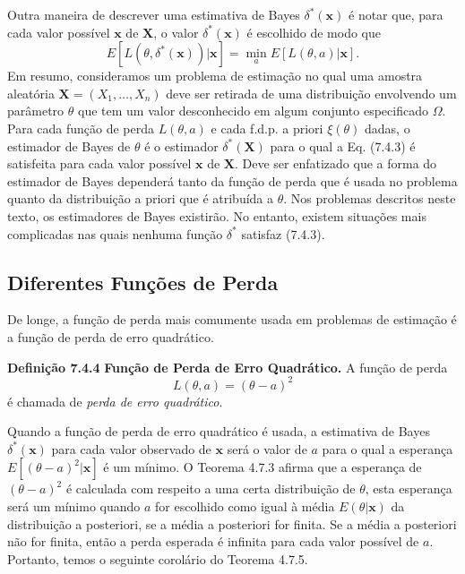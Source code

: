\vspace{1cm}
Outra maneira de descrever uma estimativa de Bayes $\delta^*(\mathbf{x})$ é notar que, para cada valor possível $\mathbf{x}$ de $\mathbf{X}$, o valor $\delta^*(\mathbf{x})$ é escolhido de modo que
\begin{equation}
E[L(\theta, \delta^*(\mathbf{x}))|\mathbf{x}] = \min_{a} E[L(\theta, a)|\mathbf{x}]. \tag{7.4.3}
\end{equation}
Em resumo, consideramos um problema de estimação no qual uma amostra aleatória $\mathbf{X}=(X_1, \dots, X_n)$ deve ser retirada de uma distribuição envolvendo um parâmetro $\theta$ que tem um valor desconhecido em algum conjunto especificado $\Omega$. Para cada função de perda $L(\theta, a)$ e cada f.d.p. a priori $\xi(\theta)$ dadas, o estimador de Bayes de $\theta$ é o estimador $\delta^*(\mathbf{X})$ para o qual a Eq. (7.4.3) é satisfeita para cada valor possível $\mathbf{x}$ de $\mathbf{X}$. Deve ser enfatizado que a forma do estimador de Bayes dependerá tanto da função de perda que é usada no problema quanto da distribuição a priori que é atribuída a $\theta$. Nos problemas descritos neste texto, os estimadores de Bayes existirão. No entanto, existem situações mais complicadas nas quais nenhuma função $\delta^*$ satisfaz (7.4.3).

\subsection*{Diferentes Funções de Perda}
De longe, a função de perda mais comumente usada em problemas de estimação é a função de perda de erro quadrático.

\vspace{1cm}
\noindent\textbf{Definição 7.4.4} \quad \textbf{Função de Perda de Erro Quadrático.} A função de perda
\begin{equation}
L(\theta, a) = (\theta-a)^2 \tag{7.4.4}
\end{equation}
é chamada de \textit{perda de erro quadrático}.

\vspace{1cm}
Quando a função de perda de erro quadrático é usada, a estimativa de Bayes $\delta^*(\mathbf{x})$ para cada valor observado de $\mathbf{x}$ será o valor de $a$ para o qual a esperança $E[(\theta-a)^2|\mathbf{x}]$ é um mínimo. O Teorema 4.7.3 afirma que a esperança de $(\theta-a)^2$ é calculada com respeito a uma certa distribuição de $\theta$, esta esperança será um mínimo quando $a$ for escolhido como igual à média $E(\theta|\mathbf{x})$ da distribuição a posteriori, se a média a posteriori for finita. Se a média a posteriori não for finita, então a perda esperada é infinita para cada valor possível de $a$. Portanto, temos o seguinte corolário do Teorema 4.7.5.

